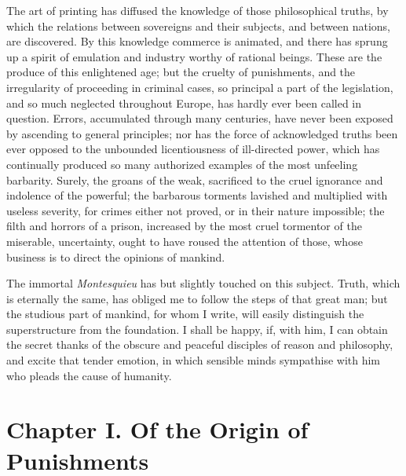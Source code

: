 The art of printing has diffused the knowledge of those
philosophical truths, by which the relations between sovereigns and
their subjects, and between nations, are discovered. By this knowledge
commerce is animated, and there has sprung up a spirit of emulation
and industry worthy of rational beings. These are the produce of this
enlightened age; but the cruelty of punishments, and the irregularity
of proceeding in criminal cases, so principal a part of the
legislation, and so much neglected throughout Europe, has hardly ever
been called in question. Errors, accumulated through many centuries,
have never been exposed by ascending to general principles; nor has
the force of acknowledged truths been ever opposed to the unbounded
licentiousness of ill-directed power, which has continually produced
so many authorized examples of the most unfeeling barbarity. Surely,
the groans of the weak, sacrificed to the cruel ignorance and
indolence of the powerful; the barbarous torments lavished and
multiplied with useless severity, for crimes either not proved, or in
their nature impossible; the filth and horrors of a prison, increased
by the most cruel tormentor of the miserable, uncertainty, ought to
have roused the attention of those, whose business is to direct the
opinions of mankind.

The immortal \textit{Montesquieu} has but slightly touched on
this subject. Truth, which is eternally the same, has obliged me to
follow the steps of that great man; but the studious part of mankind,
for whom I write, will easily distinguish the superstructure from the
foundation. I shall be happy, if, with him, I can obtain the secret
thanks of the obscure and peaceful disciples of reason and philosophy,
and excite that tender emotion, in which sensible minds sympathise
with him who pleads the cause of humanity.

\section{Chapter I. Of the Origin of Punishments}

